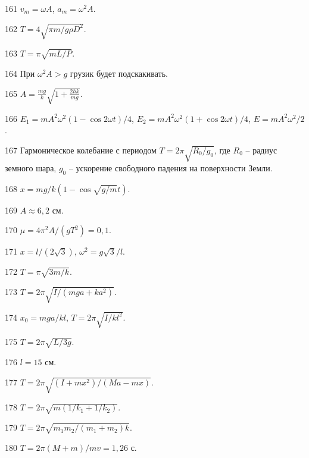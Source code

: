 \begin{Answer}{161}
$v_m = \omega A$, $a_m = \omega^2 A$.
\end{Answer}
\begin{Answer}{162}
$T = 4 \sqrt{\pi m / g \rho D^2}$.
\end{Answer}
\begin{Answer}{163}
$T = \pi \sqrt{m L /P}$.
\end{Answer}
\begin{Answer}{164}
При $\omega^2 A > g$ грузик будет подскакивать.
\end{Answer}
\begin{Answer}{165}
$A = \frac{mg}{k}\sqrt{ 1 + \frac{2hk}{mg}}$.
\end{Answer}
\begin{Answer}{166}
$E_1 = m A^2 \omega^2 (1 - \cos 2 \omega t)/4$, $E_2 = m A^2 \omega^2 (1 + \cos 2 \omega t)/4$, $E = m A^2 \omega^2 /2$.
\end{Answer}
\begin{Answer}{167}
Гармоническое колебание с периодом $T = 2 \pi \sqrt{R_0 / g_0}$, где $R_0$ -- радиус земного шара, $g_0$ -- ускорение свободного падения на поверхности Земли.
\end{Answer}
\begin{Answer}{168}
$x = mg/k(1-\cos \sqrt{g/m} t)$.
\end{Answer}
\begin{Answer}{169}
$A \approx 6,2$ см.
\end{Answer}
\begin{Answer}{170}
$\mu = 4 \pi^2 A / (gT^2) = 0,1$.
\end{Answer}
\begin{Answer}{171}
$x = l/(2\sqrt{3})$, $\omega^2 = g\sqrt{3} / l$.
\end{Answer}
\begin{Answer}{172}
$T =  \pi\sqrt{3m/k}$.
\end{Answer}
\begin{Answer}{173}
$T = 2 \pi \sqrt{I/(mga + ka^2)}$.
\end{Answer}
\begin{Answer}{174}
$x_0 = mga/kl$, $T = 2 \pi \sqrt{I/kl^2}$.
\end{Answer}
\begin{Answer}{175}
$T = 2 \pi \sqrt{L/3g}$.
\end{Answer}
\begin{Answer}{176}
$l = 15$ см.
\end{Answer}
\begin{Answer}{177}
$T = 2 \pi \sqrt{(I+mx^2)/(Ma - mx)}$.
\end{Answer}
\begin{Answer}{178}
$T = 2 \pi \sqrt{m(1/k_1 + 1/k_2)}$.
\end{Answer}
\begin{Answer}{179}
$T = 2 \pi \sqrt{m_1m_2/(m_1 + m_2)k}$.
\end{Answer}
\begin{Answer}{180}
$T = 2 \pi (M+m) / mv = 1,26$ с.
\end{Answer}
